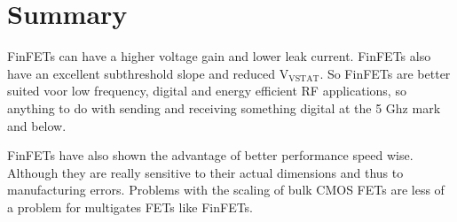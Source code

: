 \documentclass{article}
\begin{document}
\section{Summary}
FinFETs can have a higher voltage gain and lower leak current. FinFETs also have an excellent subthreshold slope and reduced $\mathrm{V}_{\mathrm{VSTAT}}$. So FinFETs are better suited voor low frequency, digital and energy efficient RF applications, so anything to do with sending and receiving something digital at the 5 Ghz mark and below. \cite{1609503}

FinFETs have also shown the advantage of better performance speed wise. Although they are really sensitive to their actual dimensions and thus to manufacturing errors. \cite{Liao20139}
Problems with the scaling of bulk CMOS FETs are less of a problem for multigates FETs like FinFETs.\cite{5318794}


\printbibliography
\end{document}
